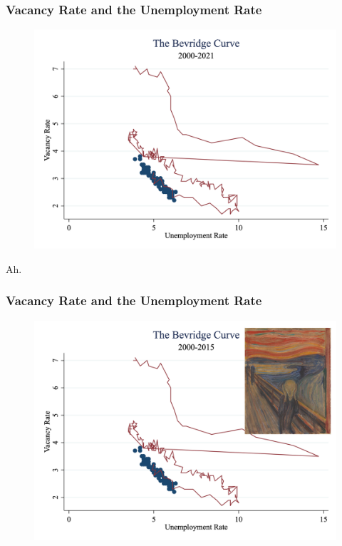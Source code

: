\documentclass{beamer}
\begin{document}
\begin{frame}
\frametitle[alignment=center]{Vacancy Rate and the Unemployment Rate}
\begin{figure}
\centering
\includegraphics[scale=0.25]{Figures/Fig_6pt8_Updated.png}
\end{figure}
Ah.
\end{frame}

\begin{frame}
\frametitle[alignment=center]{Vacancy Rate and the Unemployment Rate}
\begin{figure}
\centering
\includegraphics[scale=0.25]{Figures/Fig_6pt8_Updated_Scream.png}
\end{figure}
\end{frame}
\end{document}
